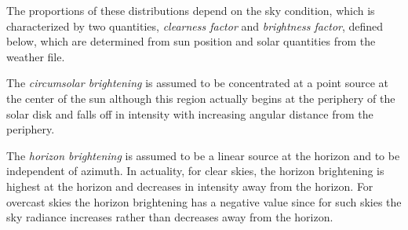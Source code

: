 The proportions of these distributions depend on the sky condition, which is characterized by two quantities, \emph{clearness factor} and \emph{brightness factor}, defined below, which are determined from sun position and solar quantities from the weather file.

The \emph{circumsolar brightening} is assumed to be concentrated at a point source at the center of the sun although this region actually begins at the periphery of the solar disk and falls off in intensity with increasing angular distance from the periphery.

The \emph{horizon brightening} is assumed to be a linear source at the horizon and to be independent of azimuth. In actuality, for clear skies, the horizon brightening is highest at the horizon and decreases in intensity away from the horizon. For overcast skies the horizon brightening has a negative value since for such skies the sky radiance increases rather than decreases away from the horizon.

